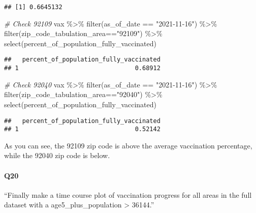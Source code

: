 \documentclass[
]{article}
\newenvironment{Shaded}{\begin{snugshade}}{\end{snugshade}}
\newcommand{\CommentTok}[1]{\textcolor[rgb]{0.56,0.35,0.01}{\textit{#1}}}
\newcommand{\FunctionTok}[1]{\textcolor[rgb]{0.00,0.00,0.00}{#1}}
\newcommand{\NormalTok}[1]{#1}
\newcommand{\SpecialCharTok}[1]{\textcolor[rgb]{0.00,0.00,0.00}{#1}}
\newcommand{\StringTok}[1]{\textcolor[rgb]{0.31,0.60,0.02}{#1}}
\begin{document}
\begin{verbatim}
## [1] 0.6645132
\end{verbatim}

\begin{Shaded}
\begin{Highlighting}[]
\CommentTok{\# Check 92109}
\NormalTok{vax }\SpecialCharTok{\%\textgreater{}\%} \FunctionTok{filter}\NormalTok{(as\_of\_date }\SpecialCharTok{==} \StringTok{"2021{-}11{-}16"}\NormalTok{) }\SpecialCharTok{\%\textgreater{}\%}  
  \FunctionTok{filter}\NormalTok{(zip\_code\_tabulation\_area}\SpecialCharTok{==}\StringTok{"92109"}\NormalTok{) }\SpecialCharTok{\%\textgreater{}\%}
  \FunctionTok{select}\NormalTok{(percent\_of\_population\_fully\_vaccinated)}
\end{Highlighting}
\end{Shaded}

\begin{verbatim}
##   percent_of_population_fully_vaccinated
## 1                                0.68912
\end{verbatim}

\begin{Shaded}
\begin{Highlighting}[]
\CommentTok{\# Check 92040}
\NormalTok{vax }\SpecialCharTok{\%\textgreater{}\%} \FunctionTok{filter}\NormalTok{(as\_of\_date }\SpecialCharTok{==} \StringTok{"2021{-}11{-}16"}\NormalTok{) }\SpecialCharTok{\%\textgreater{}\%}  
  \FunctionTok{filter}\NormalTok{(zip\_code\_tabulation\_area}\SpecialCharTok{==}\StringTok{"92040"}\NormalTok{) }\SpecialCharTok{\%\textgreater{}\%}
  \FunctionTok{select}\NormalTok{(percent\_of\_population\_fully\_vaccinated)}
\end{Highlighting}
\end{Shaded}

\begin{verbatim}
##   percent_of_population_fully_vaccinated
## 1                                0.52142
\end{verbatim}

As you can see, the 92109 zip code is above the average vaccination
percentage, while the 92040 zip code is below.

\hypertarget{q20}{%
\paragraph{Q20}\label{q20}}

``Finally make a time course plot of vaccination progress for all areas
in the full dataset with a age5\_plus\_population \textgreater{}
36144.''
\end{document}
